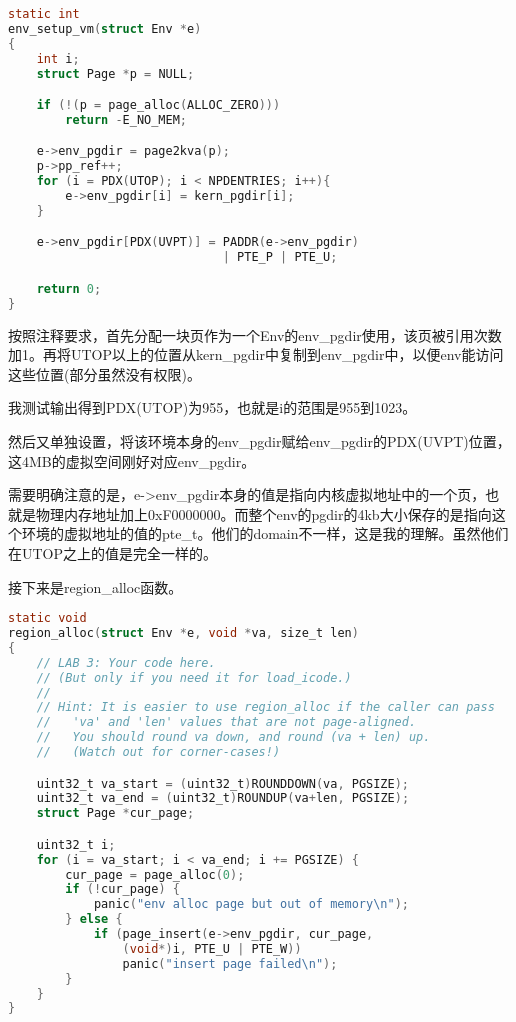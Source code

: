 \documentclass[11pt,a4paper]{article}
\begin{document}
\setmainfont{Consolas}
\begin{lstlisting}[language={C},firstnumber=1,title=kern/env.c] 
static int
env_setup_vm(struct Env *e)
{
	int i;
	struct Page *p = NULL;

	if (!(p = page_alloc(ALLOC_ZERO)))
		return -E_NO_MEM;

	e->env_pgdir = page2kva(p);
	p->pp_ref++;
	for (i = PDX(UTOP); i < NPDENTRIES; i++){
		e->env_pgdir[i] = kern_pgdir[i];
	}

	e->env_pgdir[PDX(UVPT)] = PADDR(e->env_pgdir) 
	                          | PTE_P | PTE_U;

	return 0;
}
\end{lstlisting}
\setmainfont[BoldFont=黑体]{宋体}

按照注释要求，首先分配一块页作为一个Env的env\_pgdir使用，该页被引用次数加1。再将UTOP以上的位置从kern\_pgdir中复制到env\_pgdir中，以便env能访问这些位置(部分虽然没有权限)。

我测试输出得到PDX(UTOP)为955，也就是i的范围是955到1023。

然后又单独设置，将该环境本身的env\_pgdir赋给env\_pgdir的PDX(UVPT)位置，这4MB的虚拟空间刚好对应env\_pgdir。

需要明确注意的是，e->env\_pgdir本身的值是指向内核虚拟地址中的一个页，也就是物理内存地址加上0xF0000000。而整个env的pgdir的4kb大小保存的是指向这个环境的虚拟地址的值的pte\_t。他们的domain不一样，这是我的理解。虽然他们在UTOP之上的值是完全一样的。

接下来是region\_alloc函数。

\setmainfont{Consolas}
\begin{lstlisting}[language={C},firstnumber=1,title=kern/env.c] 
static void
region_alloc(struct Env *e, void *va, size_t len)
{
	// LAB 3: Your code here.
	// (But only if you need it for load_icode.)
	//
	// Hint: It is easier to use region_alloc if the caller can pass
	//   'va' and 'len' values that are not page-aligned.
	//   You should round va down, and round (va + len) up.
	//   (Watch out for corner-cases!)

	uint32_t va_start = (uint32_t)ROUNDDOWN(va, PGSIZE);
	uint32_t va_end = (uint32_t)ROUNDUP(va+len, PGSIZE);
	struct Page *cur_page;

	uint32_t i;
	for (i = va_start; i < va_end; i += PGSIZE) {
		cur_page = page_alloc(0);
		if (!cur_page) {
			panic("env alloc page but out of memory\n");
		} else {
			if (page_insert(e->env_pgdir, cur_page,
			    (void*)i, PTE_U | PTE_W))
				panic("insert page failed\n");
		}
	}
}
\end{lstlisting}
\setmainfont[BoldFont=黑体]{宋体}
\end{document}

